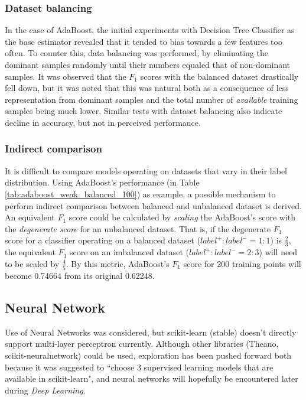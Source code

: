 \documentclass{article}
\begin{document}
	\subsubsection{Dataset balancing}
	In the case of AdaBoost, the initial experiments with Decision Tree Classifier as the base estimator revealed that it tended to bias towards a few features too often. To counter this, data balancing was performed, by eliminating the dominant samples randomly until their numbers equaled that of non-dominant samples. It was observed that the $F_1$ scores with the balanced dataset drastically fell down, but it was noted that this was natural both as a consequence of less representation from dominant samples and the total number of \emph{available} training samples being much lower. Similar tests with dataset balancing \cite{Olson2005} also indicate decline in accuracy, but not in perceived performance.
	
	\subsubsection{Indirect comparison} \label{indirect_comparison}
	It is difficult to compare models operating on datasets that vary in their label distribution. Using AdaBoost's performance (in Table \ref{tab:adaboost_weak_balanced_100}) as example, a possible mechanism to perform indirect comparison between balanced and unbalanced dataset is derived. An equivalent $F_1$ score could be calculated by \emph{scaling} the AdaBoost's score with the \emph{degenerate score} for an unbalanced dataset. That is, if the degenerate $F_1$ score for a classifier operating on a balanced dataset ($label^+:label^- = 1:1$) is $\frac{2}{3}$, the equivalent $F_1$ score on an imbalanced dataset ($label^+:label^- = 2:3$) will need to be scaled by $\frac{4}{5}$. By this metric, AdaBoost's $F_1$ score for 200 training points will become 0.74664 from its original 0.62248.
	
	\subsection{Neural Network}
	Use of Neural Networks was considered, but scikit-learn (stable) doesn't directly support multi-layer perceptron currently. Although other libraries (Theano, scikit-neuralnetwork) could be used, exploration has been pushed forward both because it was suggested to ``choose 3 supervised learning models that are available in scikit-learn", and neural networks will hopefully be encountered later during \emph{Deep Learning}.
	
	
	
\end{document}

